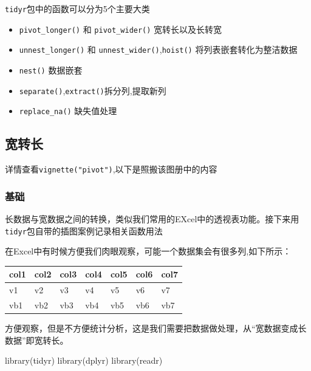 \documentclass[
]{book}
\newenvironment{Shaded}{\begin{snugshade}}{\end{snugshade}}
\newcommand{\FunctionTok}[1]{\textcolor[rgb]{0.00,0.00,0.00}{#1}}
\newcommand{\NormalTok}[1]{#1}
\begin{document}
\texttt{tidyr}包中的函数可以分为5个主要大类

\begin{itemize}
\item
  \texttt{pivot\_longer()} 和 \texttt{pivot\_wider()} 宽转长以及长转宽
\item
  \texttt{unnest\_longer()} 和 \texttt{unnest\_wider()},\texttt{hoist()} 将列表嵌套转化为整洁数据
\item
  \texttt{nest()} 数据嵌套
\item
  \texttt{separate()},\texttt{extract()}拆分列,提取新列
\item
  \texttt{replace\_na()} 缺失值处理
\end{itemize}

\hypertarget{ux5bbdux8f6cux957f}{%
\subsection{宽转长}\label{ux5bbdux8f6cux957f}}

详情查看\texttt{vignette("pivot")},以下是照搬该图册中的内容

\hypertarget{ux57faux7840-1}{%
\subsubsection{基础}\label{ux57faux7840-1}}

长数据与宽数据之间的转换，类似我们常用的EXcel中的透视表功能。接下来用\texttt{tidyr}包自带的插图案例记录相关函数用法

在Excel中有时候方便我们肉眼观察，可能一个数据集会有很多列,如下所示：

\begin{longtable}[]{@{}lllllll@{}}
\toprule
col1 & col2 & col3 & col4 & col5 & col6 & col7 \\
\midrule
\endhead
v1 & v2 & v3 & v4 & v5 & v6 & v7 \\
vb1 & vb2 & vb3 & vb4 & vb5 & vb6 & vb7 \\
\bottomrule
\end{longtable}

方便观察，但是不方便统计分析，这是我们需要把数据做处理，从``宽数据变成长数据''即宽转长。

\begin{Shaded}
\begin{Highlighting}[]
\FunctionTok{library}\NormalTok{(tidyr)}
\FunctionTok{library}\NormalTok{(dplyr)}
\FunctionTok{library}\NormalTok{(readr)}
\end{Highlighting}
\end{Shaded}
\end{document}
